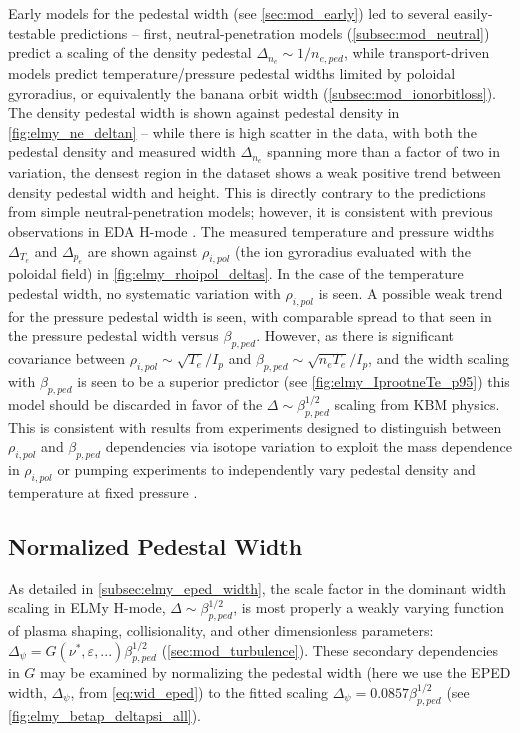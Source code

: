 Early models for the pedestal width (see \cref{sec:mod_early}) led to several easily-testable predictions -- first, neutral-penetration models (\cref{subsec:mod_neutral}) predict a scaling of the density pedestal $\Delta_{n_e} \sim 1/n_{e,ped}$, while transport-driven models predict temperature/pressure pedestal widths limited by poloidal gyroradius, or equivalently the banana orbit width (\cref{subsec:mod_ionorbitloss}).  The density pedestal width is shown against pedestal density in \cref{fig:elmy_ne_deltan} -- while there is high scatter in the data, with both the pedestal density and measured width $\Delta_{n_e}$ spanning more than a factor of two in variation, the densest region in the dataset shows a weak positive trend between density pedestal width and height.  This is directly contrary to the predictions from simple neutral-penetration models; however, it is consistent with previous observations in EDA H-mode \cite{Hughes2002}.  The measured temperature and pressure widths $\Delta_{T_e}$ and $\Delta_{p_e}$ are shown against $\rho_{i,pol}$ (the ion gyroradius evaluated with the poloidal field) in \cref{fig:elmy_rhoipol_deltas}.  In the case of the temperature pedestal width, no systematic variation with $\rho_{i,pol}$ is seen.  A possible weak trend for the pressure pedestal width is seen, with comparable spread to that seen in the pressure pedestal width versus $\beta_{p,ped}$.  However, as there is significant covariance between $\rho_{i,pol} \sim \sqrt{T_e}/I_p$ and $\beta_{p,ped} \sim \sqrt{n_e T_e}/I_p$, and the width scaling with $\beta_{p,ped}$ is seen to be a superior predictor (see \cref{fig:elmy_IprootneTe_p95}) this model should be discarded in favor of the $\Delta \sim \beta_{p,ped}^{1/2}$ scaling from KBM physics.  This is consistent with results from experiments designed to distinguish between $\rho_{i,pol}$ and $\beta_{p,ped}$ dependencies via isotope variation to exploit the mass dependence in $\rho_{i,pol}$ \cite{Urano2008} or pumping experiments to independently vary pedestal density and temperature at fixed pressure \cite{Osborne1998,Maggi2010}.

\subsection{Normalized Pedestal Width}\label{subsec:elmy_normwidth}

As detailed in \cref{subsec:elmy_eped_width}, the scale factor in the dominant width scaling in ELMy H-mode, $\Delta \sim \beta_{p,ped}^{1/2}$, is most properly a weakly varying function of plasma shaping, collisionality, and other dimensionless parameters: $\Delta_\psi = G(\nu^*,\varepsilon,...) \beta_{p,ped}^{1/2}$ \cite{Snyder2011} (\cf \cref{sec:mod_turbulence}).  These secondary dependencies in $G$ may be examined by normalizing the pedestal width (here we use the EPED width, $\Delta_\psi$, from \cref{eq:wid_eped}) to the fitted scaling $\Delta_\psi = 0.0857 \beta_{p,ped}^{1/2}$ (see \cref{fig:elmy_betap_deltapsi_all}).  

